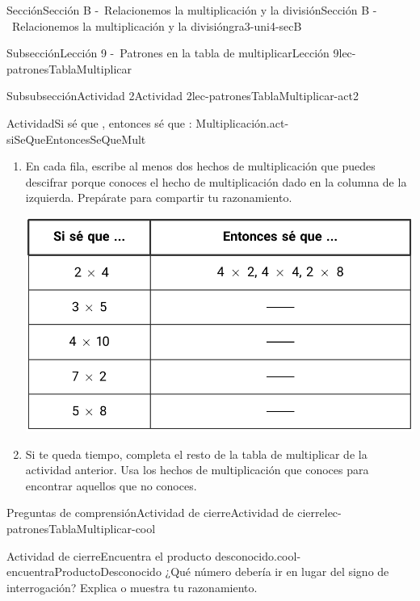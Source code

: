 \documentclass[twoside,10pt,]{article}
\begin{document}
\begin{sectionptx}{Sección}{Sección B -~Relacionemos la multiplicación y la división}{}{Sección B -~Relacionemos la multiplicación y la división}{}{}{gra3-uni4-secB}
\begin{subsectionptx}{Subsección}{Lección 9 -~Patrones en la tabla de multiplicar}{}{Lección 9}{}{}{lec-patronesTablaMultiplicar}
\begin{subsubsectionptx}{Subsubsección}{Actividad 2}{}{Actividad 2}{}{}{lec-patronesTablaMultiplicar-act2}
\begin{activity}{Actividad}{Si sé que \textellipsis{}, entonces sé que \textellipsis{}: Multiplicación.}{act-siSeQueEntoncesSeQueMult}
%
\begin{enumerate}
\item{}En cada fila, escribe al menos dos hechos de multiplicación que puedes descifrar porque conoces el hecho de multiplicación dado en la columna de la izquierda. Prepárate para compartir tu razonamiento.%
\begin{image}{0}{1}{0}{}%
\includegraphics[width=\linewidth]{external/tikz-source/siSeQueEntoncesSeQueMult-tab.pdf}
\end{image}%
\item{}Si te queda tiempo, completa el resto de la tabla de multiplicar de la actividad anterior. Usa los hechos de multiplicación que conoces para encontrar aquellos que no conoces.%
\end{enumerate}
\end{activity}%
\end{subsubsectionptx}
%
%
\typeout{************************************************}
\typeout{************************************************}
%
\begin{reading-questions-subsubsection}{Preguntas de comprensión}{Actividad de cierre}{}{Actividad de cierre}{}{}{lec-patronesTablaMultiplicar-cool}
\begin{project}{Actividad de cierre}{Encuentra el producto desconocido.}{cool-encuentraProductoDesconocido}%
¿Qué número debería ir en lugar del signo de interrogación? Explica o muestra tu razonamiento.%
\begin{image}{0}{1}{0}{}%

\end{image}
\end{project}
\end{reading-questions-subsubsection}
\end{subsectionptx}
\end{sectionptx}
\end{document}
